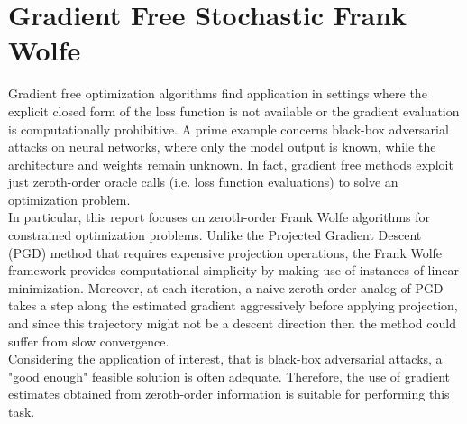 \section{Gradient Free Stochastic Frank Wolfe}
Gradient free optimization algorithms find application in settings where the explicit closed form of the loss function is not available or the gradient evaluation is computationally prohibitive. A prime example concerns black-box adversarial attacks on neural networks, where only the model output is known, while the architecture and weights remain unknown. In fact, gradient free methods exploit just zeroth-order oracle calls (i.e. loss function evaluations) to solve an optimization problem.\\
In particular, this report focuses on zeroth-order Frank Wolfe algorithms for constrained optimization problems. Unlike the Projected Gradient Descent (PGD) method that requires expensive projection operations, the Frank Wolfe framework provides computational simplicity by making use of instances of linear minimization. Moreover, at each iteration, a naive zeroth-order analog of PGD takes a step along the estimated gradient aggressively before applying projection, and since this trajectory might not be a descent direction then the method could suffer from slow convergence.\\
Considering the application of interest, that is black-box adversarial attacks, a "good enough" feasible solution is often adequate. Therefore, the use of gradient estimates obtained from zeroth-order information is suitable for performing this task.\\

